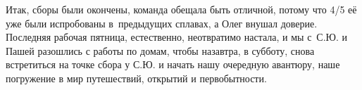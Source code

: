 Итак, сборы были окончены, команда обещала быть отличной, потому что 4/5 её уже были испробованы в~предыдущих сплавах, а Олег внушал доверие. Последняя рабочая пятница, естественно, неотвратимо настала, и мы с~С.Ю. и Пашей разошлись с работы по домам, чтобы назавтра, в субботу, снова встретиться на точке сбора у С.Ю. и начать нашу очередную авантюру, наше погружение в мир путешествий, открытий и первобытности.

\begin{center}
\end{center}
